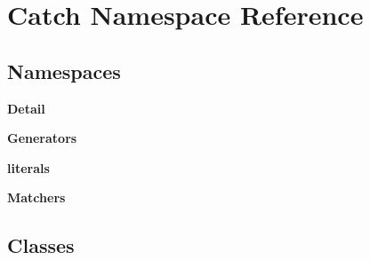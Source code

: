 \section{Catch Namespace Reference}
\label{namespace_catch}
\subsection*{Namespaces}
\begin{DoxyCompactItemize}
\item 
 \textbf{ Detail}
\item 
 \textbf{ Generators}
\item 
 \textbf{ literals}
\item 
 \textbf{ Matchers}
\end{DoxyCompactItemize}
\subsection*{Classes}

